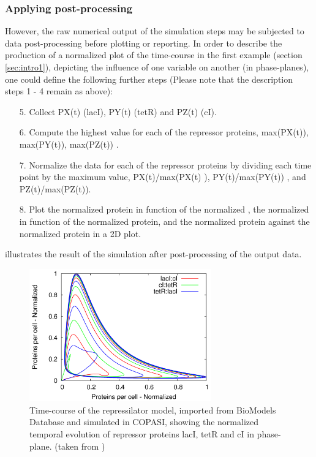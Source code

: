 \subsubsection{Applying post-processing}
However, the raw numerical output of the simulation steps may be subjected to data post-processing before plotting or reporting.  In order to describe the production of a normalized plot of the time-course in the first example (section \ref{sec:intro1}), depicting the influence of one variable on another (in phase-planes), one could define the following further steps (Please note that the description steps 1 - 4 remain as above): 
\begin{enumerate}
\item[5.]{Collect PX(t) (lacI), PY(t) (tetR) and PZ(t) (cI).}
\item[6.]{Compute the highest value for each of the repressor proteins,  max(PX(t)), max(PY(t)), max(PZ(t)) .}
\item[7.]{Normalize the data for each of the repressor proteins by dividing each time point by the maximum value, \ie PX(t)/max(PX(t) ), PY(t)/max(PY(t)) , and PZ(t)/max(PZ(t)).}
\item[8.]{Plot the normalized  protein in function of the normalized , the normalized  in function of the normalized  protein, and the normalized  protein against the normalized  protein in a 2D plot.}
\end{enumerate}
 illustrates the result of the simulation after post-processing of the output data. 
\begin{figure}
\centering
\includegraphics[width=0.7\textwidth]{images/simEx2.png}
\caption{Time-course of the repressilator model, imported from BioModels Database and simulated in COPASI, showing the normalized temporal evolution of repressor proteins lacI, tetR and cI in phase-plane. (taken from \citep{Waltemath:2010})}
\label{fig:simEx2}
\end{figure}
%


